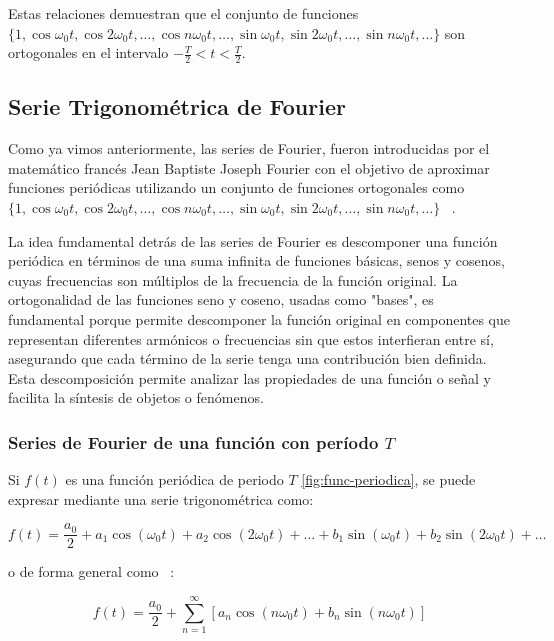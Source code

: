 Estas relaciones demuestran que el conjunto de funciones $\{1, \cos \omega_0 t, \cos 2\omega_0 t, \ldots, \cos n \omega_0 t, \ldots, \sin \omega_0 t, \sin 2\omega_0 t, \ldots, \sin n \omega_0 t, \ldots \}$ son ortogonales en el intervalo $-\frac{T}{2} < t < \frac{T}{2}$.

\subsection{Serie Trigonométrica de Fourier}
Como ya vimos anteriormente, las series de Fourier, fueron introducidas por el matemático francés Jean Baptiste Joseph Fourier con el objetivo de aproximar funciones periódicas utilizando un conjunto de funciones ortogonales como $\{1, \cos \omega_0 t, \cos 2\omega_0 t, \dots, \cos n\omega_0 t, \dots, \sin \omega_0 t, \sin 2\omega_0 t, \dots, \sin n\omega_0 t, \dots\}$ ~\cite{matesAvanzadasZill}.

La idea fundamental detrás de las series de Fourier es descomponer una función periódica en términos de una suma infinita de funciones básicas, senos y cosenos, cuyas frecuencias son múltiplos de la frecuencia de la función original. La ortogonalidad de las funciones seno y coseno, usadas como "bases", es fundamental porque permite descomponer la función original en componentes que representan diferentes armónicos o frecuencias sin que estos interfieran entre sí, asegurando que cada término de la serie tenga una contribución bien definida. Esta descomposición permite analizar las propiedades de una función o señal y facilita la síntesis de objetos o fenómenos.

\subsubsection{Series de Fourier de una función con período $T$}

Si $f(t)$ es una función periódica de periodo $T$ \ref{fig:func-periodica}, se puede expresar mediante una serie trigonométrica como:

\begin{equation}\label{eq26}
	f(t) = \frac{a_0}{2} + a_1 \cos(\omega_0 t) + a_2 \cos(2\omega_0 t) + \dots + b_1 \sin(\omega_0 t) + b_2 \sin(2\omega_0 t) + \dots
\end{equation}


o de forma general como ~\cite{fourierHsu}:

\begin{equation}\label{eq27}
f(t) = \frac{a_0}{2} + \sum_{n=1}^{\infty} \left[a_n \cos(n\omega_0 t) + b_n \sin(n\omega_0 t)\right]
\end{equation}

